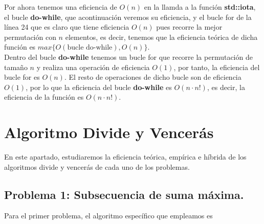 \documentclass[11pt,openany]{book}
\begin{document}
Por ahora tenemos una eficiencia de $O(n)$ en la llamda a la función \textbf{std::iota}, el bucle \textbf{do-while}, que acontinuación veremos su eficiencia, y el 
bucle for de la línea 24 que es claro que tiene eficiencia $O(n)$ pues recorre la mejor permutación con $n$ elementos, es decir, tenemos que la eficiencia teórica
de dicha función es $max\{O(\text{bucle do-while}), O(n)\}$. \\
Dentro del bucle \textbf{do-while} tenemos un bucle for que recorre la permutación de tamaño $n$ y realiza una operación de eficiencia $O(1)$, por tanto, la eficiencia
del bucle for es $O(n)$. El resto de operaciones de dicho bucle son de eficiencia $O(1)$, por lo que la eficiencia del bucle \textbf{do-while} es $O(n\cdot n!)$, es decir,
la eficiencia de la función es $O(n\cdot n!)$.



\chapter{Algoritmo Divide y Vencerás}
En este apartado, estudiaremos la eficiencia teórica, empírica e híbrida de los algoritmos divide y vencerás
de cada uno de los problemas.
\section{Problema 1: Subsecuencia de suma máxima.}
Para el primer problema, el algoritmo específico que empleamos es
\end{document}
